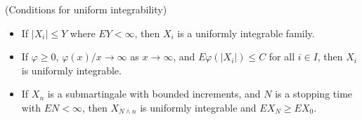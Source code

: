 \begin{proposition}
	(Conditions for uniform integrability)
	\label{prop:UICond}
	\begin{itemize}
		\item If $|X_i| \le  Y$ where $E Y < \infty $, then $X_i$ is a uniformly integrable family.
		\item If $\varphi\ge 0$,  $\varphi(x) / x \to  \infty $ as $x \to  \infty $, and $E \varphi(|X_i|) \le  C$ for all $i \in I$, then $X_i$ is uniformly integrable.
		\item If $X_n$ is a submartingale with bounded increments, and $N$ is a stopping time with $EN < \infty $, then $X_{N \wedge n}$ is uniformly integrable and $E X_N \ge  E X_0$.
	\end{itemize}
\end{proposition}

